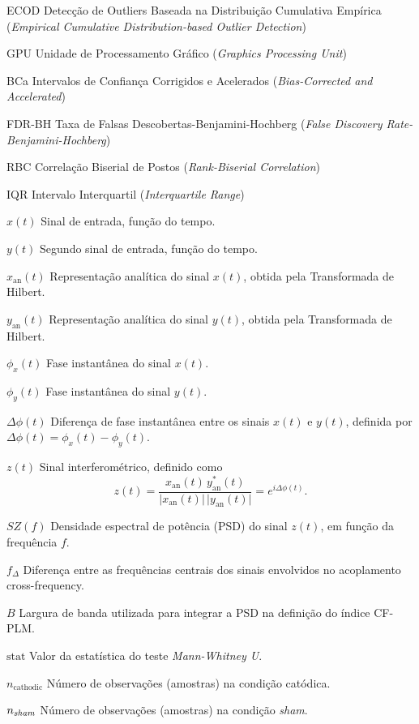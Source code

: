 \documentclass[
  12pt,
  openany,
  twoside,
  a4paper,
  english,
  brazil
]{abntex2}
\begin{document}
\begin{siglas}
  \item[ECOD] Detecção de Outliers Baseada na Distribuição Cumulativa Empírica (\textit{Empirical Cumulative Distribution-based Outlier Detection})
  \item[GPU] Unidade de Processamento Gráfico (\textit{Graphics Processing Unit})
  \item[BCa] Intervalos de Confiança Corrigidos e Acelerados (\textit{Bias-Corrected and Accelerated})
  \item[FDR-BH] Taxa de Falsas Descobertas-Benjamini-Hochberg (\textit{False Discovery Rate-Benjamini-Hochberg})
  \item[RBC] Correlação Biserial de Postos (\textit{Rank-Biserial Correlation})
  \item[IQR] Intervalo Interquartil (\textit{Interquartile Range})
\end{siglas}


\begin{simbolos}
  \item[$x(t)$] Sinal de entrada, função do tempo.
  \item[$y(t)$] Segundo sinal de entrada, função do tempo.
  \item[$x_{\mathrm{an}}(t)$] Representação analítica do sinal \(x(t)\), obtida pela Transformada de Hilbert.
  \item[$y_{\mathrm{an}}(t)$] Representação analítica do sinal \(y(t)\), obtida pela Transformada de Hilbert.
  \item[$\phi_x(t)$] Fase instantânea do sinal \(x(t)\).
  \item[$\phi_y(t)$] Fase instantânea do sinal \(y(t)\).
  \item[$\Delta \phi(t)$] Diferença de fase instantânea entre os sinais \(x(t)\) e \(y(t)\), definida por \(\Delta \phi(t) = \phi_x(t)-\phi_y(t)\).
  \item[$z(t)$] Sinal interferométrico, definido como 
  \[
  z(t)=\frac{x_{\mathrm{an}}(t)\, y_{\mathrm{an}}^*(t)}{\lvert x_{\mathrm{an}}(t)\rvert\, \lvert y_{\mathrm{an}}(t)\rvert} = e^{i\Delta \phi(t)}.
  \]
  \item[$SZ(f)$] Densidade espectral de potência (PSD) do sinal \(z(t)\), em função da frequência \(f\).
  \item[$f_\Delta$] Diferença entre as frequências centrais dos sinais envolvidos no acoplamento cross-frequency.
  \item[$B$] Largura de banda utilizada para integrar a PSD na definição do índice CF-PLM.
  \item[$\text{stat}$] Valor da estatística do teste \textit{Mann-Whitney U}.
  \item[$n_{\text{cathodic}}$] Número de observações (amostras) na condição catódica.
  \item[$n_{\text{\textit{sham}}}$] Número de observações (amostras) na condição \textit{sham}.
\end{simbolos}
\end{document}
